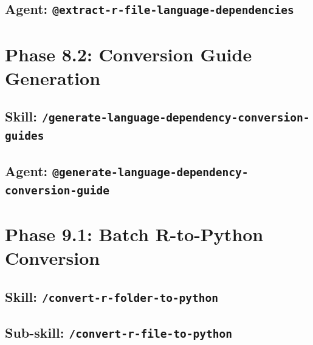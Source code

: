 \documentclass[12pt]{article}
\begin{document}


\subsection{Agent: \texttt{@extract-r-file-language-dependencies}}
\label{app:agent:extract-r-file-language-dependencies}



\section{Phase 8.2: Conversion Guide Generation}
\label{app:phase8.2}

\subsection{Skill: \texttt{/generate-language-dependency-conversion-guides}}
\label{app:skill:generate-language-dependency-conversion-guides}



\subsection{Agent: \texttt{@generate-language-dependency-conversion-guide}}
\label{app:agent:generate-language-dependency-conversion-guide}



\section{Phase 9.1: Batch R-to-Python Conversion}
\label{app:phase9.1}

\subsection{Skill: \texttt{/convert-r-folder-to-python}}
\label{app:skill:convert-r-folder-to-python}



\subsection{Sub-skill: \texttt{/convert-r-file-to-python}}
\label{app:skill:convert-r-file-to-python}
\end{document}
